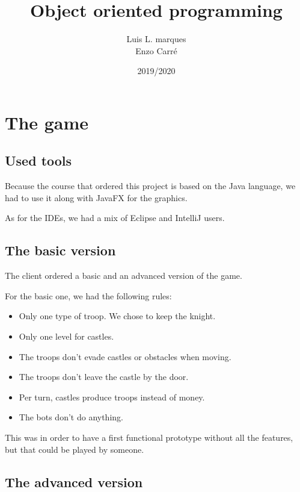 \documentclass[12pt, a4paper]{report}
\title{Object oriented programming}
\author{Luis L. marques\\Enzo Carré}
\date{2019/2020}
\begin{document}
\maketitle
\tableofcontents

\newpage
\section*{The game}

\subsection*{Used tools}

Because the course that ordered this project is based on the Java language, we had to use it along with JavaFX for the graphics.

As for the IDEs, we had a mix of Eclipse and IntelliJ users.

\subsection*{The basic version}

The client ordered a basic and an advanced version of the game.

For the basic one, we had the following rules:

\begin{itemize}
    \item Only one type of troop. We chose to keep the knight.
    \item Only one level for castles.
    \item The troops don't evade castles or obstacles when moving.
    \item The troops don't leave the castle by the door.
    \item Per turn, castles produce troops instead of money.
    \item The bots don't do anything.
\end{itemize}

This was in order to have a first functional prototype without all the features, but that could be played by someone.

\subsection*{The advanced version}
\end{document}
